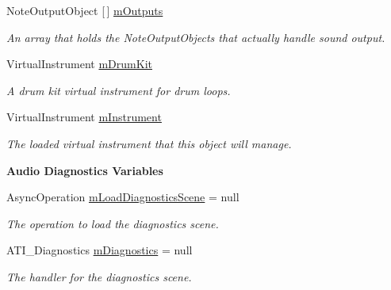 \begin{Indent}
\begin{DoxyCompactItemize}
\mbox{\label{group___virtual_instrument_manager_a53f837fd01475fa35629a650e7fa00e3}} 
Note\+Output\+Object \mbox{[}$\,$\mbox{]} \hyperlink{group___virtual_instrument_manager_a53f837fd01475fa35629a650e7fa00e3}{m\+Outputs}
\begin{DoxyCompactList}\small\item\em An array that holds the Note\+Output\+Objects that actually handle sound output. \end{DoxyCompactList}\item 
\mbox{\label{group___virtual_instrument_manager_a0bc7c9f776b0d2dae0ccb1f1ee5f2143}} 
Virtual\+Instrument \hyperlink{group___virtual_instrument_manager_a0bc7c9f776b0d2dae0ccb1f1ee5f2143}{m\+Drum\+Kit}
\begin{DoxyCompactList}\small\item\em A drum kit virtual instrument for drum loops. \end{DoxyCompactList}\item 
\mbox{\label{group___virtual_instrument_manager_aed435d1f9be09864846db4322dc21fd1}} 
Virtual\+Instrument \hyperlink{group___virtual_instrument_manager_aed435d1f9be09864846db4322dc21fd1}{m\+Instrument}
\begin{DoxyCompactList}\small\item\em The loaded virtual instrument that this object will manage. \end{DoxyCompactList}\end{DoxyCompactItemize}
\end{Indent}
\begin{Indent}\textbf{ Audio Diagnostics Variables}\par
\begin{DoxyCompactItemize}
\item 
\mbox{\label{group___virtual_instrument_manager_a90c209c382663b4689a1a72f98b23d41}} 
Async\+Operation \hyperlink{group___virtual_instrument_manager_a90c209c382663b4689a1a72f98b23d41}{m\+Load\+Diagnostics\+Scene} = null
\begin{DoxyCompactList}\small\item\em The operation to load the diagnostics scene. \end{DoxyCompactList}\item 
\mbox{\label{group___virtual_instrument_manager_a61670e91d1470a1d9a57829ac35688f1}} 
A\+T\+I\+\_\+\+Diagnostics \hyperlink{group___virtual_instrument_manager_a61670e91d1470a1d9a57829ac35688f1}{m\+Diagnostics} = null
\begin{DoxyCompactList}\small\item\em The handler for the diagnostics scene. \end{DoxyCompactList}\end{DoxyCompactItemize}
\end{Indent}
